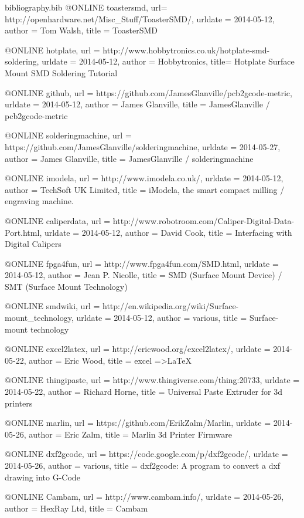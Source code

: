 
\begin{filecontents}{bibliography.bib}
@ONLINE {toastersmd,
    url= {http://openhardware.net/Misc_Stuff/ToasterSMD/},
    urldate = {2014-05-12},
    author = {Tom Walsh},
    title = {ToasterSMD}}
    
@ONLINE {hotplate,
	url = {http://www.hobbytronics.co.uk/hotplate-smd-soldering},
	urldate = {2014-05-12},
	author = {Hobbytronics},
	title= {Hotplate Surface Mount SMD Soldering Tutorial}}
	
@ONLINE {github,
	url = {https://github.com/JamesGlanville/pcb2gcode-metric},
	urldate = {2014-05-12},
	author = {James Glanville},
	title = {JamesGlanville / pcb2gcode-metric}}
	
@ONLINE {solderingmachine,
	url = {https://github.com/JamesGlanville/solderingmachine},
	urldate = {2014-05-27},
	author = {James Glanville},
	title = {JamesGlanville / solderingmachine}}
	
@ONLINE {imodela,
	url = {http://www.imodela.co.uk/},
	urldate = {2014-05-12},
	author = {TechSoft UK Limited},
	title = {iModela, the smart compact milling / engraving machine.}}
	
@ONLINE {caliperdata,
	url = {http://www.robotroom.com/Caliper-Digital-Data-Port.html},
	urldate = {2014-05-12},
	author = {David Cook},
	title = {Interfacing with Digital Calipers}}
	
@ONLINE {fpga4fun,
	url = {http://www.fpga4fun.com/SMD.html},
	urldate = {2014-05-12},
	author = {Jean P. Nicolle},
	title = {SMD (Surface Mount Device) / SMT (Surface Mount Technology)}}
	
@ONLINE {smdwiki,
	url = {http://en.wikipedia.org/wiki/Surface-mount_technology},
	urldate = {2014-05-12},
	author = {various},
	title = {Surface-mount technology}}
	
@ONLINE {excel2latex,
	url = {http://ericwood.org/excel2latex/},
	urldate = {2014-05-22},
	author = {Eric Wood},
	title = {excel =\textgreater LaTeX}}
	
@ONLINE {thingipaste,
	url = {http://www.thingiverse.com/thing:20733},
	urldate = {2014-05-22},
	author = {Richard Horne},
	title = {Universal Paste Extruder for 3d printers}}
	
@ONLINE {marlin,
	url = {https://github.com/ErikZalm/Marlin},
	urldate = {2014-05-26},
	author = {Eric Zalm},
	title = {Marlin 3d Printer Firmware}}
	
@ONLINE {dxf2gcode,
	url = {https://code.google.com/p/dxf2gcode/},
	urldate = {2014-05-26},
	author = {various},
	title = {dxf2gcode: A program to convert a dxf drawing into G-Code}}
	
@ONLINE {Cambam,
	url = {http://www.cambam.info/},
	urldate = {2014-05-26},
	author = {HexRay Ltd},
	title = {Cambam}}
\end{filecontents}

